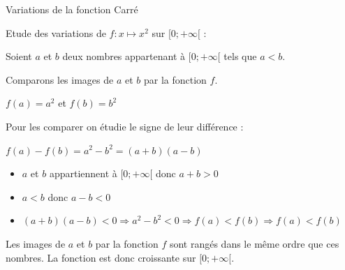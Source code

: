 \begin{pageCours}
\begin{minipage}{0.48\linewidth}
\begin{ThT}{Variations de la fonction Carré}

\end{ThT}

\end{minipage}
\hfill
\begin{minipage}{0.48\linewidth}

\begin{Pv}
Etude des variations de $f:x\mapsto x^2$ sur $[0;+\infty[$ :

Soient $a$ et $b$ deux nombres appartenant à $[0;+\infty[$ tels que $a<b$. 

Comparons les images de $a$ et $b$ par la fonction $f$.

$f(a)=a^2$ et $f(b)=b^2$

Pour les comparer on étudie le signe de leur différence :

$f(a)-f(b)=a^2-b^2=(a+b)(a-b)$

\begin{itemize}
\item $a$ et $b$ appartiennent à $[0;+\infty[$ donc $a+b>0$
\item $a<b$ donc $a-b<0$
\item $(a+b)(a-b)<0\Rightarrow a^2-b^2<0 \Rightarrow f(a)<f(b) \Rightarrow f(a)<f(b)$
\end{itemize}

Les images de $a$ et $b$ par la fonction $f$ sont rangés dans le même ordre que ces nombres. La fonction est donc croissante sur $[0;+\infty[$.

\end{Pv}

\end{minipage}

\end{pageCours} %

